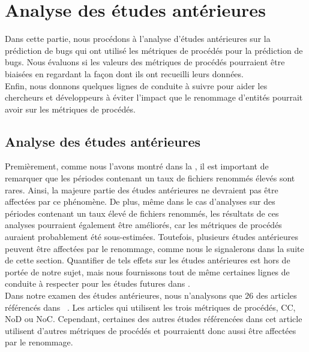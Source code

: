 \section{Analyse des études antérieures}
\label{sec:analyse}

Dans cette partie, nous procédons à l’analyse d’études antérieures sur la prédiction de bugs qui ont utilisé les métriques de procédés pour la prédiction de bugs. Nous évaluons si les valeurs des métriques de procédés pourraient être biaisées en regardant la façon dont ils ont recueilli leurs données.\\
Enfin, nous donnons quelques lignes de conduite à suivre pour aider les chercheurs et développeurs à éviter l’impact que le renommage d’entités pourrait avoir sur les métriques de procédés.  

\subsection{Analyse des études antérieures}

Premièrement, comme nous l'avons montré dans la , il est important de remarquer que les périodes contenant un taux de fichiers renommés élevés sont rares. Ainsi, la majeure partie des études antérieures ne devraient pas être affectées par ce phénomène. De plus, même dans le cas d'analyses sur des périodes contenant un taux élevé de fichiers renommés, les résultats de ces analyses pourraient également être améliorés, car les métriques de procédés auraient probablement été sous-estimées. Toutefois, plusieurs études antérieures peuvent être affectées par le renommage, comme nous le signalerons dans la suite de cette section. Quantifier de tels effets sur les études antérieures est hors de portée de notre sujet, mais nous fournissons tout de même certaines lignes de conduite à respecter pour les études futures dans .\\

Dans notre examen des études antérieures, nous n'analysons que $26$ des articles référencés dans ~\cite{radjenovic_software_2013}. Les articles qui utilisent les trois métriques de procédés, CC, NoD ou NoC. Cependant, certaines des autres études référencées dans cet article utilisent d'autres métriques de procédés et pourraientt donc aussi être affectées par le renommage.\\

